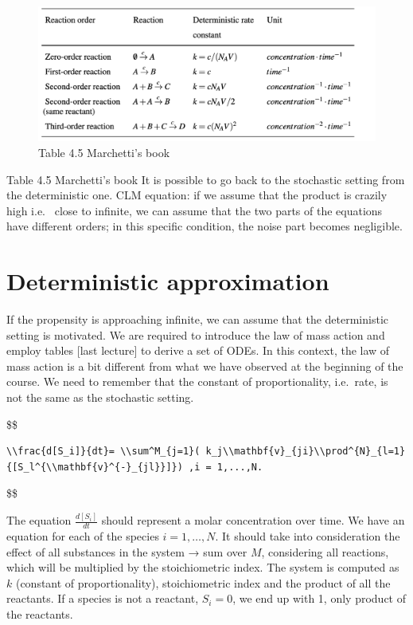 \begin{figure}
  \centering
  \includegraphics{reaction_rates.png}
  \caption{Table 4.5 Marchetti's book}
\end{figure}

Table 4.5 Marchetti's book It is possible to go back to the stochastic setting from the deterministic one.
CLM equation: if we assume that the product is crazily high i.e. ~close to infinite, we can assume that the two parts of the equations have different orders; in this specific condition, the noise part becomes negligible.

\section{Deterministic approximation}
If the propensity is approaching infinite, we can assume that the deterministic setting is motivated.
We are required to introduce the law of mass action and employ tables {[}last lecture{]} to derive a set of ODEs.
In this context, the law of mass action is a bit different from what we have observed at the beginning of the course.
We need to remember that the constant of proportionality, i.e.~rate, is not the same as the stochastic setting.

\$\$ \begin{verbatim}\\frac{d[S_i]}{dt}= \\sum^M_{j=1}( k_j\\mathbf{v}_{ji}\\prod^{N}_{l=1}{[S_l^{\\mathbf{v}^{-}_{jl}}]}) ,i = 1,...,N.\end{verbatim}\$\$

The equation $\frac{d[S_i]}{dt}$ should represent a molar concentration over time.
We have an equation for each of the species $i=1,…,N$.
It should take into consideration the effect of all substances in the system → sum over $M$, considering all reactions, which will be multiplied by the stoichiometric index.
The system is computed as $k$ (constant of proportionality), stoichiometric index and the product of all the reactants.
If a species is not a reactant, $S_i=0$, we end up with 1, only product of the reactants.

